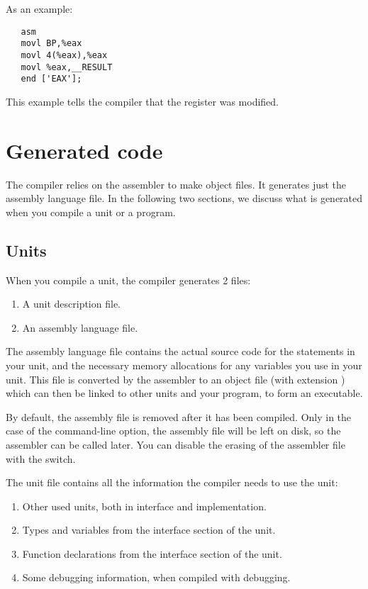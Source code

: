As an example:
\begin{verbatim}
   asm
   movl BP,%eax
   movl 4(%eax),%eax
   movl %eax,__RESULT
   end ['EAX'];
\end{verbatim}
This example tells the compiler that the  register was modified.



\chapter{Generated code}
\label{ch:GenCode}
The \fpc compiler relies on the assembler to make object files. It generates
just the assembly language file. In the following two sections, we discuss
what is generated when you compile a unit or a program.

\section{Units}
\label{se:Units}
When you compile a unit, the \fpc compiler generates 2 files:
\begin{enumerate}
\item A unit description file.
\item An assembly language file.
\end{enumerate}
The assembly language file contains the actual source code for the
statements in your unit, and the necessary memory allocations for any
variables you use in your unit. This file is converted by the assembler to
an object file (with extension ) which can then be linked to other
units and your program, to form an executable.

By default, the assembly file is removed after it has been compiled.
Only in the case of the  command-line option, the assembly file
will be left on disk, so the assembler can be called later. You can
disable the erasing of the assembler file with the  switch.

The unit file contains all the information the compiler needs to use the
unit:
\begin{enumerate}
\item Other used units, both in interface and implementation.
\item Types and variables from the interface section of the unit.
\item Function declarations from the interface section of the unit.
\item Some debugging information, when compiled with debugging.
\end{enumerate}

